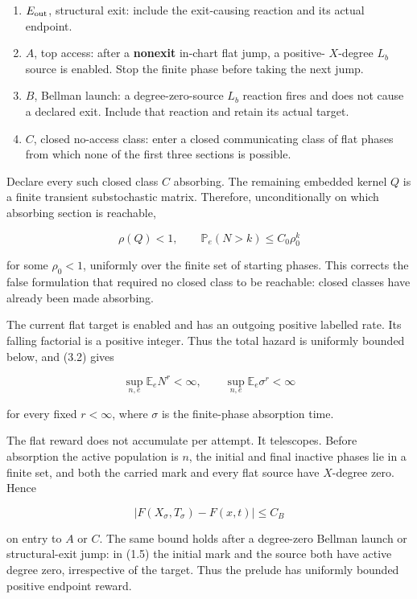 \begin{enumerate}
\def\labelenumi{\arabic{enumi}.}
\tightlist
\item
  \(E_{\rm out}\), structural exit: include the exit-causing reaction
  and its actual endpoint.
\item
  \(A\), top access: after a \textbf{nonexit} in-chart flat jump, a
  positive- \(X\)-degree \(L_b\) source is enabled. Stop the finite
  phase before taking the next jump.
\item
  \(B\), Bellman launch: a degree-zero-source \(L_b\) reaction fires and
  does not cause a declared exit. Include that reaction and retain its
  actual target.
\item
  \(C\), closed no-access class: enter a closed communicating class of
  flat phases from which none of the first three sections is possible.
\end{enumerate}

Declare every such closed class \(C\) absorbing. The remaining embedded
kernel \(Q\) is a finite transient substochastic matrix. Therefore,
unconditionally on which absorbing section is reachable,

\[
             \rho(Q)<1,\qquad
             \mathbb P_e(N>k)\le C_0\rho_0^k           \tag{3.2}
\]

for some \(\rho_0<1\), uniformly over the finite set of starting phases.
This corrects the false formulation that required no closed class to be
reachable: closed classes have already been made absorbing.

The current flat target is enabled and has an outgoing positive labelled
rate. Its falling factorial is a positive integer. Thus the total hazard
is uniformly bounded below, and (3.2) gives

\[
                    \sup_{n,e}\mathbb E_e N^r<\infty,
                    \qquad
                    \sup_{n,e}\mathbb E_e \sigma^r<\infty             \tag{3.3}
\]

for every fixed \(r<\infty\), where \(\sigma\) is the finite-phase
absorption time.

The flat reward does not accumulate per attempt. It telescopes. Before
absorption the active population is \(n\), the initial and final
inactive phases lie in a finite set, and both the carried mark and every
flat source have \(X\)-degree zero. Hence

\[
                 |F(X_\sigma,T_\sigma)-F(x,t)|\le C_B             \tag{3.4}
\]

on entry to \(A\) or \(C\). The same bound holds after a degree-zero
Bellman launch or structural-exit jump: in (1.5) the initial mark and
the source both have active degree zero, irrespective of the target.
Thus the prelude has uniformly bounded positive endpoint reward.

